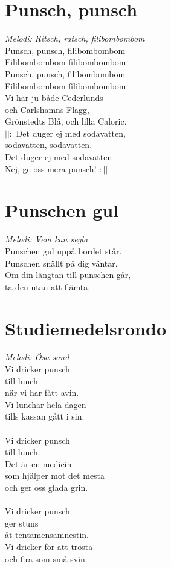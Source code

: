 \section{Punsch, punsch}
\textit{Melodi: Ritsch, ratsch, filibombombom}
\vspace{2mm}\\
Punsch, punsch, filibombombom\\
Filibombombom filibombombom\\
Punsch, punsch, filibombombom\\
Filibombombom filibombombom\\
Vi har ju både Cederlunds\\
och Carlshamns Flagg,\\
Grönstedts Blå, och lilla Caloric.\\
$||:$ Det duger ej med sodavatten,\\
sodavatten, sodavatten.\\
Det duger ej med sodavatten\\
Nej, ge oss mera punsch! $:||$

\section{Punschen gul}
\textit{Melodi: Vem kan segla}
\vspace{2mm}\\
Punschen gul uppå bordet står.\\
Punschen snällt på dig väntar.\\
Om din längtan till punschen går,\\
ta den utan att flämta.

\section{Studiemedelsrondo}
\textit{Melodi: Ösa sand}
\vspace{2mm}\\
Vi dricker punsch\\
till lunch\\
när vi har fått avin.\\
Vi lunchar hela dagen\\
tills kassan gått i sin.\\
\\
Vi dricker punsch\\
till lunch.\\
Det är en medicin\\
som hjälper mot det mesta\\
och ger oss glada grin.\\
\\
Vi dricker punsch\\
ger stuns\\
åt tentamensamnestin.\\
Vi dricker för att trösta\\
och fira som små svin.


